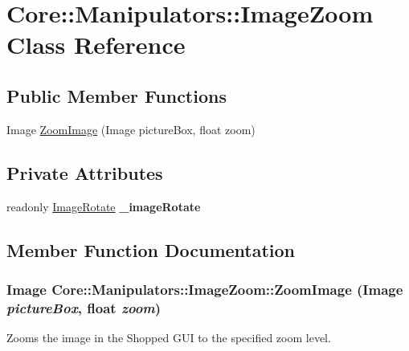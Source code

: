\hypertarget{class_core_1_1_manipulators_1_1_image_zoom}{
\section{Core::Manipulators::ImageZoom Class Reference}
\label{class_core_1_1_manipulators_1_1_image_zoom}
}
\subsection*{Public Member Functions}
\begin{DoxyCompactItemize}
\item 
Image \hyperlink{class_core_1_1_manipulators_1_1_image_zoom_a6582d4fd8538b70a0948031612a60eda}{ZoomImage} (Image pictureBox, float zoom)
\end{DoxyCompactItemize}
\subsection*{Private Attributes}
\begin{DoxyCompactItemize}
\item 
\hypertarget{class_core_1_1_manipulators_1_1_image_zoom_adacb4823b97df94da5501e3a9e282703}{
readonly \hyperlink{class_core_1_1_manipulators_1_1_image_rotate}{ImageRotate} {\bfseries \_\-imageRotate}}
\label{class_core_1_1_manipulators_1_1_image_zoom_adacb4823b97df94da5501e3a9e282703}

\end{DoxyCompactItemize}


\subsection{Member Function Documentation}
\hypertarget{class_core_1_1_manipulators_1_1_image_zoom_a6582d4fd8538b70a0948031612a60eda}{
\subsubsection[{ZoomImage}]{\setlength{\rightskip}{0pt plus 5cm}Image Core::Manipulators::ImageZoom::ZoomImage (Image {\em pictureBox}, \/  float {\em zoom})}}
\label{class_core_1_1_manipulators_1_1_image_zoom_a6582d4fd8538b70a0948031612a60eda}
Zooms the image in the Shopped GUI to the specified zoom level.


